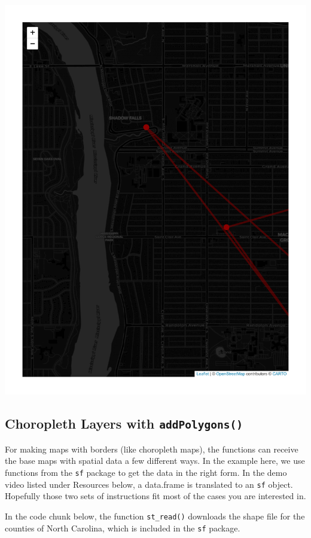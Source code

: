 \documentclass[
  letterpaper,
  DIV=11,
  numbers=noendperiod]{scrreprt}
\begin{document}
\includegraphics{src/06-Spatial_Viz_files/figure-pdf/unnamed-chunk-26-1.pdf}

\subsection*{\texorpdfstring{Choropleth Layers with
\texttt{addPolygons()}}{Choropleth Layers with addPolygons()}}\label{choropleth-layers-with-addpolygons}

For making maps with borders (like choropleth maps), the functions can
receive the base maps with spatial data a few different ways. In the
example here, we use functions from the \texttt{sf} package to get the
data in the right form. In the demo video listed under Resources below,
a data.frame is translated to an \texttt{sf} object. Hopefully those two
sets of instructions fit most of the cases you are interested in.

In the code chunk below, the function \texttt{st\_read()} downloads the
shape file for the counties of North Carolina, which is included in the
\texttt{sf} package.
\end{document}
